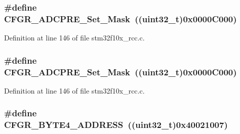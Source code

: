 \subsubsection[{\texorpdfstring{C\+F\+G\+R\+\_\+\+A\+D\+C\+P\+R\+E\+\_\+\+Set\+\_\+\+Mask}{CFGR_ADCPRE_Set_Mask}}]{\setlength{\rightskip}{0pt plus 5cm}\#define C\+F\+G\+R\+\_\+\+A\+D\+C\+P\+R\+E\+\_\+\+Set\+\_\+\+Mask~(({\bf uint32\+\_\+t})0x0000\+C000)}\hypertarget{group___r_c_c___private___defines_gaead9b35ba6e98274613c28d24bd228cc}{}\label{group___r_c_c___private___defines_gaead9b35ba6e98274613c28d24bd228cc}


Definition at line 146 of file stm32f10x\+\_\+rcc.\+c.

\subsubsection[{\texorpdfstring{C\+F\+G\+R\+\_\+\+A\+D\+C\+P\+R\+E\+\_\+\+Set\+\_\+\+Mask}{CFGR_ADCPRE_Set_Mask}}]{\setlength{\rightskip}{0pt plus 5cm}\#define C\+F\+G\+R\+\_\+\+A\+D\+C\+P\+R\+E\+\_\+\+Set\+\_\+\+Mask~(({\bf uint32\+\_\+t})0x0000\+C000)}\hypertarget{group___r_c_c___private___defines_gaead9b35ba6e98274613c28d24bd228cc}{}\label{group___r_c_c___private___defines_gaead9b35ba6e98274613c28d24bd228cc}


Definition at line 146 of file stm32f10x\+\_\+rcc.\+c.

\subsubsection[{\texorpdfstring{C\+F\+G\+R\+\_\+\+B\+Y\+T\+E4\+\_\+\+A\+D\+D\+R\+E\+SS}{CFGR_BYTE4_ADDRESS}}]{\setlength{\rightskip}{0pt plus 5cm}\#define C\+F\+G\+R\+\_\+\+B\+Y\+T\+E4\+\_\+\+A\+D\+D\+R\+E\+SS~(({\bf uint32\+\_\+t})0x40021007)}\hypertarget{group___r_c_c___private___defines_ga5fea86b59ec4be059d922db57cca3b3f}{}\label{group___r_c_c___private___defines_ga5fea86b59ec4be059d922db57cca3b3f}



